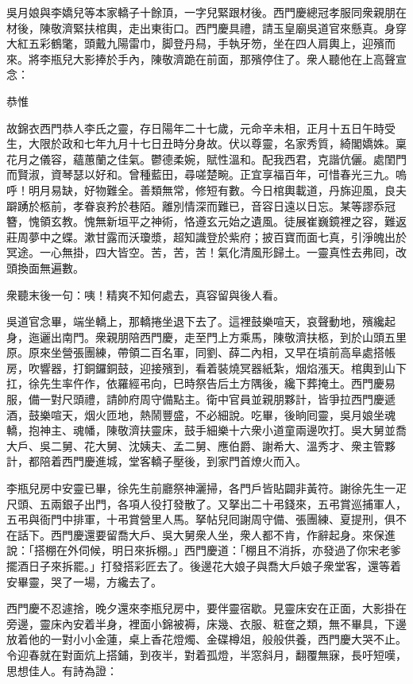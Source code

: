 吳月娘與李嬌兒等本家轎子十餘頂，一字兒緊跟材後。西門慶總冠孝服同衆親朋在材後，陳敬濟緊扶棺輿，走出東街口。西門慶具禮，請玉皇廟吳道官來懸真。身穿大紅五彩鶴氅，頭戴九陽雷巾，脚登丹舄，手執牙笏，坐在四人肩輿上，迎殯而來。將李瓶兒大影捧於手內，陳敬濟跪在前面，那殯停住了。衆人聽他在上高聲宣念：

恭惟

故錦衣西門恭人李氏之靈，存日陽年二十七歲，元命辛未相，正月十五日午時受生，大限於政和七年九月十七日丑時分身故。伏以尊靈，名家秀質，綺閣嬌姝。稟花月之儀容，蘊蕙蘭之佳氣。鬱德柔婉，賦性溫和。配我西君，克諧伉儷。處閨門而賢淑，資琴瑟以好和。曾種藍田，尋嗟楚畹。正宜享福百年，可惜春光三九。{}嗚呼！明月易缺，好物難全。善類無常，修短有數。今日棺輿載道，丹旆迎風，良夫躃踴於柩前，孝眷哀矜於巷陌。離別情深而難已，音容日遠以日忘。某等謬忝冠簪，愧領玄教。愧無新垣平之神術，{}恪遵玄元始之遺風。徒展崔巍鏡裡之容，難返莊周夢中之蝶。漱甘露而沃瓊漿，超知識登於紫府；披百寶而面七真，引淨魄出於冥途。一心無掛，四大皆空。苦，苦，苦！氣化清風形歸土。一靈真性去弗囘，改頭換面無遍數。

衆聽末後一句：咦！精爽不知何處去，真容留與後人看。

吳道官念畢，端坐轎上，那轎捲坐退下去了。這裡鼓樂喧天，哀聲動地，殯纔起身，迤邐出南門。衆親朋陪西門慶，走至門上方乘馬，陳敬濟扶柩，到於山頭五里原。原來坐營張團練，帶領二百名軍，同劉、薛二內相，又早在墳前高阜處搭帳房，吹響器，打銅鑼銅鼓，迎接殯到，{}看着裝燒冥器紙紮，烟焰漲天。棺輿到山下扛，徐先生率仵作，依羅經弔向，巳時祭告后土方隅後，纔下葬掩土。西門慶易服，備一對尺頭禮，請帥府周守備點主。衛中官員並親朋夥計，皆爭拉西門慶遞酒，鼓樂喧天，烟火匝地，熱鬧豐盛，不必細說。吃畢，後晌囘靈，吳月娘坐魂轎，抱神主、魂幡，陳敬濟扶靈床，鼓手細樂十六衆小道童兩邊吹打。吳大舅並喬大戶、吳二舅、花大舅、沈姨夫、孟二舅、應伯爵、謝希大、溫秀才、衆主管夥計，都陪着西門慶進城，堂客轎子壓後，到家門首燎火而入。

李瓶兒房中安靈已畢，徐先生前廳祭神灑掃，各門戶皆貼闢非黃符。謝徐先生一疋尺頭、五兩銀子出門，各項人役打發散了。又拏出二十弔錢來，五弔賞巡捕軍人，五弔與衙門中排軍，十弔賞營里人馬。拏帖兒囘謝周守備、張團練、夏提刑，俱不在話下。西門慶還要留喬大戶、吳大舅衆人坐，衆人都不肯，作辭起身。來保進說：「搭棚在外伺候，明日來拆棚。」西門慶道：「棚且不消拆，亦發過了你宋老爹擺酒日子來拆罷。」打發搭彩匠去了。後邊花大娘子與喬大戶娘子衆堂客，還等着安畢靈，哭了一場，方纔去了。

西門慶不忍遽捨，晚夕還來李瓶兒房中，要伴靈宿歇。見靈床安在正面，大影掛在旁邊，靈床內安着半身，裡面小錦被褥，床幾、衣服、粧奩之類，無不畢具，下邊放着他的一對小小金蓮，{}桌上香花燈燭、金碟樽俎，般般供養，西門慶大哭不止。令迎春就在對面炕上搭鋪，到夜半，對着孤燈，半窓斜月，翻覆無寐，長吁短嘆，思想佳人。有詩為證：

